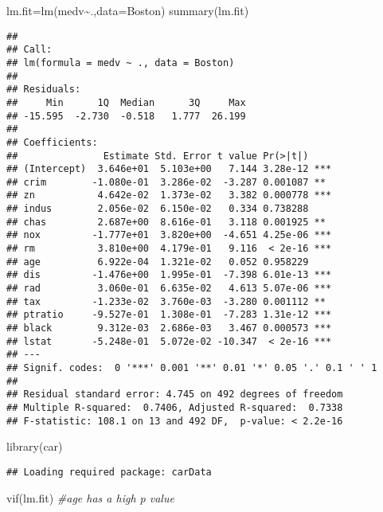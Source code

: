 \documentclass[
]{article}
\newenvironment{Shaded}{\begin{snugshade}}{\end{snugshade}}
\newcommand{\AttributeTok}[1]{\textcolor[rgb]{0.77,0.63,0.00}{#1}}
\newcommand{\CommentTok}[1]{\textcolor[rgb]{0.56,0.35,0.01}{\textit{#1}}}
\newcommand{\FunctionTok}[1]{\textcolor[rgb]{0.00,0.00,0.00}{#1}}
\newcommand{\NormalTok}[1]{#1}
\newcommand{\OtherTok}[1]{\textcolor[rgb]{0.56,0.35,0.01}{#1}}
\newcommand{\SpecialCharTok}[1]{\textcolor[rgb]{0.00,0.00,0.00}{#1}}
\begin{document}
\begin{Shaded}
\begin{Highlighting}[]
\NormalTok{lm.fit}\OtherTok{=}\FunctionTok{lm}\NormalTok{(medv}\SpecialCharTok{\textasciitilde{}}\NormalTok{.,}\AttributeTok{data=}\NormalTok{Boston)}
\FunctionTok{summary}\NormalTok{(lm.fit)}
\end{Highlighting}
\end{Shaded}

\begin{verbatim}
## 
## Call:
## lm(formula = medv ~ ., data = Boston)
## 
## Residuals:
##     Min      1Q  Median      3Q     Max 
## -15.595  -2.730  -0.518   1.777  26.199 
## 
## Coefficients:
##               Estimate Std. Error t value Pr(>|t|)    
## (Intercept)  3.646e+01  5.103e+00   7.144 3.28e-12 ***
## crim        -1.080e-01  3.286e-02  -3.287 0.001087 ** 
## zn           4.642e-02  1.373e-02   3.382 0.000778 ***
## indus        2.056e-02  6.150e-02   0.334 0.738288    
## chas         2.687e+00  8.616e-01   3.118 0.001925 ** 
## nox         -1.777e+01  3.820e+00  -4.651 4.25e-06 ***
## rm           3.810e+00  4.179e-01   9.116  < 2e-16 ***
## age          6.922e-04  1.321e-02   0.052 0.958229    
## dis         -1.476e+00  1.995e-01  -7.398 6.01e-13 ***
## rad          3.060e-01  6.635e-02   4.613 5.07e-06 ***
## tax         -1.233e-02  3.760e-03  -3.280 0.001112 ** 
## ptratio     -9.527e-01  1.308e-01  -7.283 1.31e-12 ***
## black        9.312e-03  2.686e-03   3.467 0.000573 ***
## lstat       -5.248e-01  5.072e-02 -10.347  < 2e-16 ***
## ---
## Signif. codes:  0 '***' 0.001 '**' 0.01 '*' 0.05 '.' 0.1 ' ' 1
## 
## Residual standard error: 4.745 on 492 degrees of freedom
## Multiple R-squared:  0.7406, Adjusted R-squared:  0.7338 
## F-statistic: 108.1 on 13 and 492 DF,  p-value: < 2.2e-16
\end{verbatim}

\begin{Shaded}
\begin{Highlighting}[]
\FunctionTok{library}\NormalTok{(car)}
\end{Highlighting}
\end{Shaded}

\begin{verbatim}
## Loading required package: carData
\end{verbatim}

\begin{Shaded}
\begin{Highlighting}[]
\FunctionTok{vif}\NormalTok{(lm.fit) }\CommentTok{\#age has a high p value}
\end{Highlighting}
\end{Shaded}
\end{document}
